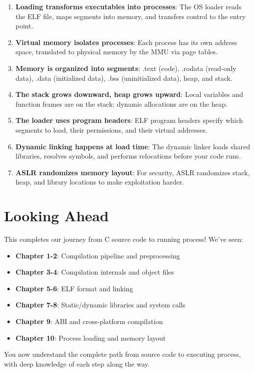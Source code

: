 \begin{enumerate}
    \item \textbf{Loading transforms executables into processes}: The OS loader reads the ELF file, maps segments into memory, and transfers control to the entry point.
    \item \textbf{Virtual memory isolates processes}: Each process has its own address space, translated to physical memory by the MMU via page tables.
    \item \textbf{Memory is organized into segments}: .text (code), .rodata (read-only data), .data (initialized data), .bss (uninitialized data), heap, and stack.
    \item \textbf{The stack grows downward, heap grows upward}: Local variables and function frames are on the stack; dynamic allocations are on the heap.
    \item \textbf{The loader uses program headers}: ELF program headers specify which segments to load, their permissions, and their virtual addresses.
    \item \textbf{Dynamic linking happens at load time}: The dynamic linker loads shared libraries, resolves symbols, and performs relocations before your code runs.
    \item \textbf{ASLR randomizes memory layout}: For security, ASLR randomizes stack, heap, and library locations to make exploitation harder.
\end{enumerate}

\section{Looking Ahead}

This completes our journey from C source code to running process! We've seen:
\begin{itemize}
    \item \textbf{Chapter 1-2}: Compilation pipeline and preprocessing
    \item \textbf{Chapter 3-4}: Compilation internals and object files
    \item \textbf{Chapter 5-6}: ELF format and linking
    \item \textbf{Chapter 7-8}: Static/dynamic libraries and system calls
    \item \textbf{Chapter 9}: ABI and cross-platform compilation
    \item \textbf{Chapter 10}: Process loading and memory layout
\end{itemize}

You now understand the complete path from source code to executing process, with deep knowledge of each step along the way.
